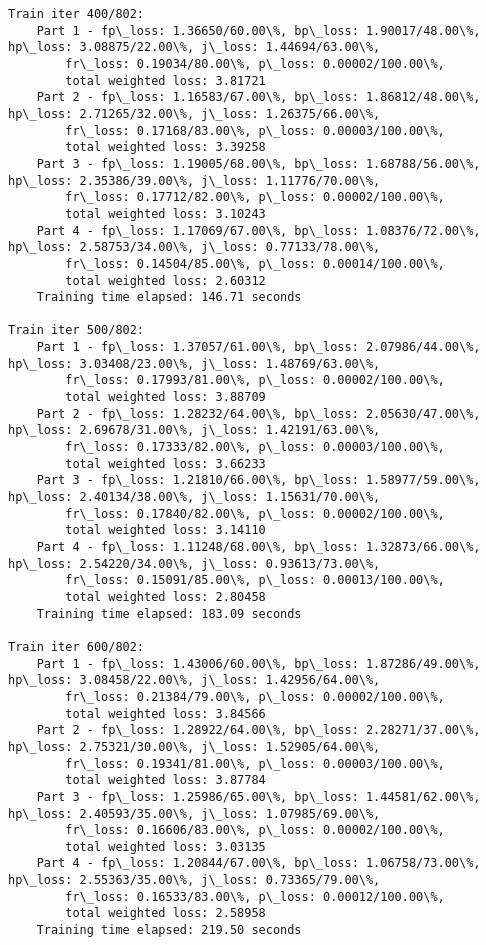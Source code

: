 \documentclass[11pt]{article}
\begin{document}
\begin{Verbatim}[commandchars=\\\{\}]
Train iter 400/802:
	Part 1 - fp\_loss: 1.36650/60.00\%, bp\_loss: 1.90017/48.00\%, hp\_loss: 3.08875/22.00\%, j\_loss: 1.44694/63.00\%, 
		fr\_loss: 0.19034/80.00\%, p\_loss: 0.00002/100.00\%, 
		total weighted loss: 3.81721
	Part 2 - fp\_loss: 1.16583/67.00\%, bp\_loss: 1.86812/48.00\%, hp\_loss: 2.71265/32.00\%, j\_loss: 1.26375/66.00\%, 
		fr\_loss: 0.17168/83.00\%, p\_loss: 0.00003/100.00\%, 
		total weighted loss: 3.39258
	Part 3 - fp\_loss: 1.19005/68.00\%, bp\_loss: 1.68788/56.00\%, hp\_loss: 2.35386/39.00\%, j\_loss: 1.11776/70.00\%, 
		fr\_loss: 0.17712/82.00\%, p\_loss: 0.00002/100.00\%, 
		total weighted loss: 3.10243
	Part 4 - fp\_loss: 1.17069/67.00\%, bp\_loss: 1.08376/72.00\%, hp\_loss: 2.58753/34.00\%, j\_loss: 0.77133/78.00\%, 
		fr\_loss: 0.14504/85.00\%, p\_loss: 0.00014/100.00\%, 
		total weighted loss: 2.60312
	Training time elapsed: 146.71 seconds

Train iter 500/802:
	Part 1 - fp\_loss: 1.37057/61.00\%, bp\_loss: 2.07986/44.00\%, hp\_loss: 3.03408/23.00\%, j\_loss: 1.48769/63.00\%, 
		fr\_loss: 0.17993/81.00\%, p\_loss: 0.00002/100.00\%, 
		total weighted loss: 3.88709
	Part 2 - fp\_loss: 1.28232/64.00\%, bp\_loss: 2.05630/47.00\%, hp\_loss: 2.69678/31.00\%, j\_loss: 1.42191/63.00\%, 
		fr\_loss: 0.17333/82.00\%, p\_loss: 0.00003/100.00\%, 
		total weighted loss: 3.66233
	Part 3 - fp\_loss: 1.21810/66.00\%, bp\_loss: 1.58977/59.00\%, hp\_loss: 2.40134/38.00\%, j\_loss: 1.15631/70.00\%, 
		fr\_loss: 0.17840/82.00\%, p\_loss: 0.00002/100.00\%, 
		total weighted loss: 3.14110
	Part 4 - fp\_loss: 1.11248/68.00\%, bp\_loss: 1.32873/66.00\%, hp\_loss: 2.54220/34.00\%, j\_loss: 0.93613/73.00\%, 
		fr\_loss: 0.15091/85.00\%, p\_loss: 0.00013/100.00\%, 
		total weighted loss: 2.80458
	Training time elapsed: 183.09 seconds

Train iter 600/802:
	Part 1 - fp\_loss: 1.43006/60.00\%, bp\_loss: 1.87286/49.00\%, hp\_loss: 3.08458/22.00\%, j\_loss: 1.42956/64.00\%, 
		fr\_loss: 0.21384/79.00\%, p\_loss: 0.00002/100.00\%, 
		total weighted loss: 3.84566
	Part 2 - fp\_loss: 1.28922/64.00\%, bp\_loss: 2.28271/37.00\%, hp\_loss: 2.75321/30.00\%, j\_loss: 1.52905/64.00\%, 
		fr\_loss: 0.19341/81.00\%, p\_loss: 0.00003/100.00\%, 
		total weighted loss: 3.87784
	Part 3 - fp\_loss: 1.25986/65.00\%, bp\_loss: 1.44581/62.00\%, hp\_loss: 2.40593/35.00\%, j\_loss: 1.07985/69.00\%, 
		fr\_loss: 0.16606/83.00\%, p\_loss: 0.00002/100.00\%, 
		total weighted loss: 3.03135
	Part 4 - fp\_loss: 1.20844/67.00\%, bp\_loss: 1.06758/73.00\%, hp\_loss: 2.55363/35.00\%, j\_loss: 0.73365/79.00\%, 
		fr\_loss: 0.16533/83.00\%, p\_loss: 0.00012/100.00\%, 
		total weighted loss: 2.58958
	Training time elapsed: 219.50 seconds


\end{Verbatim}
\end{document}
